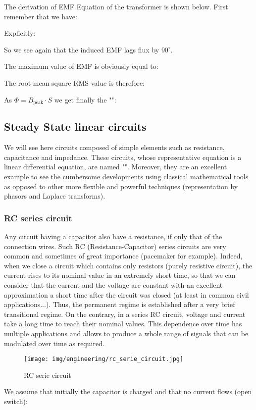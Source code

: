 	The derivation of EMF Equation of the transformer is shown below. First remember that we have:
	
	Explicitly:
	
	So we see again that the induced EMF lags flux by $90^\circ$.

	The maximum value of EMF is obviously equal to:
	
	The root mean square RMS value is therefore:
	
	As $\Phi=B_\text{peak}\cdot S$ we get finally the "":
	
	
	\pagebreak
	\subsection{Steady State linear circuits}
	We will see here circuits composed of simple elements such as resistance, capacitance and impedance. These circuits, whose representative equation is a linear differential equation, are named "". Moreover, they are an excellent example to see the cumbersome developments using classical mathematical tools as opposed to other more flexible and powerful techniques (representation by phasors and Laplace transforms).
	
	\subsubsection{RC series circuit}
	Any circuit having a capacitor also have a resistance, if only that of the connection wires. Such RC (Resistance-Capacitor) series circuits are very common and sometimes of great importance (pacemaker for example). Indeed, when we close a circuit which contains only resistors (purely resistive circuit), the current rises to its nominal value in an extremely short time, so that we can consider that the current and the voltage are constant with an excellent approximation a short time after the circuit was closed (at least in common civil applications...). Thus, the permanent regime is established after a very brief transitional regime. On the contrary, in a series RC circuit, voltage and current take a long time to reach their nominal values. This dependence over time has multiple applications and allows to produce a whole range of signals that can be modulated over time as required.
	\begin{figure}[H]
		\centering
		\texttt{[image: img/engineering/rc\_serie\_circuit.jpg]}
		\caption{RC serie circuit}
	\end{figure}
	We assume that initially the capacitor is charged and that no current flows (open switch):
	
